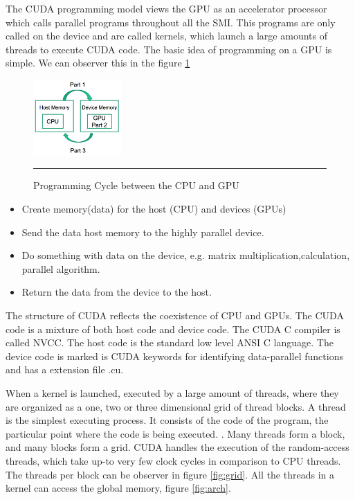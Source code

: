 The CUDA programming model views the GPU as an accelerator processor which calls parallel programs  throughout all the SMI. This programs are only called on the device and are called kernels, which launch a large amounts of threads to execute CUDA code. The basic idea of programming on a GPU is simple. We can observer this in the figure \ref{fig:cycle}

\begin{figure}[htbp]
	\centering
		\includegraphics[width=0.3\textwidth]{Figures/cycle.png}
		\rule{35em}{0.5pt}
	\caption[Programming Cycle]{Programming Cycle between the CPU and GPU}
	\label{fig:cycle}
\end{figure}


\begin{itemize}
\item Create memory(data) for the host (CPU) and devices (GPUs)
\item Send the data host memory to the highly parallel device.
\item Do something with data on the device, e.g. matrix multiplication,calculation, parallel algorithm.
\item Return the data from the device to the host.
\end{itemize}

The structure of CUDA reflects the coexistence of CPU and GPUs. The CUDA code is a mixture of both host code and device code. The CUDA C compiler is called NVCC. The host code is the standard low level ANSI C language. The device code is marked is CUDA keywords for identifying data-parallel functions and has a extension file .cu.

When a kernel is launched, executed by a large amount of threads, where they are organized as a one, two or three dimensional grid of thread blocks. A thread is the simplest executing process. It consists of the code of the program, the particular point where the code is being executed. \cite{hwu}. Many threads form a block, and many blocks form a grid. CUDA handles the execution of the random-access threads, which take up-to very few clock cycles in comparison to CPU threads. The threads per block can be observer in figure \ref{fig:grid}. All the threads in a kernel can access the global memory, figure \ref{fig:arch}.

